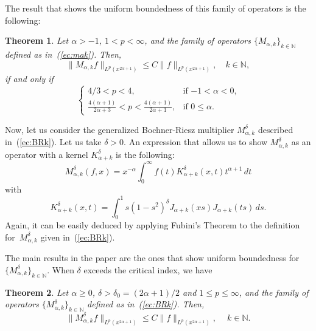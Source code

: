 \documentclass{amsart}
\newtheorem{thm}{Theorem}
\theoremstyle{remark}
\newcommand{\N}{\mathbb{N}}
\newcommand{\mak}{M_{\alpha,k}}
\newcommand{\BRk}{M_{\alpha,k}^{\delta}}
\newcommand{\KBRk}{K_{\alpha+k}^{\delta}} %
\newcommand{\lpnorm}[2]{\|{#1}\|_{L^{#2}(x^{2\alpha+1})}}
\begin{document}
The result that shows the uniform boundedness of this family of operators
is the following:

\begin{thm}
\label{thm:mak}
Let $\alpha > -1$, $1 < p < \infty$, and the family of operators
$\{\mak\}_{k\in\N}$ defined as in~(\ref{ec:mak}). Then,
\begin{equation*}
    \lpnorm{\mak f}{p} \le C \lpnorm{f}{p},
    \quad k\in \N,
\end{equation*}
if and only if
\begin{equation*}
\begin{cases}
    4/3 < p < 4, &\text{if \ $-1 < \alpha < 0$,} \\
    \frac{4(\alpha+1)}{2\alpha+3} < p 
      < \frac{4(\alpha+1)}{2\alpha+1}, &\text{if \ $0 \le \alpha$.}
\end{cases}
\end{equation*}
\end{thm}

Now, let us consider the generalized Bochner-Riesz multiplier $\BRk$ described
in~(\ref{ec:BRk}). Let us take $\delta>0$.
An expression that allows us to show $\BRk$ as an operator with a kernel
$\KBRk$ is the following:
\begin{equation*}
    \BRk(f,x)
    = x^{-\alpha} \int_0^{\infty} f(t) \KBRk(x,t) t^{\alpha+1} \, dt
\end{equation*}
with
\begin{equation}
\label{ec:KernelBRkintermedia}
    \KBRk(x,t)
    = \int_0^1 s (1-s^2)^{\delta}
      J_{\alpha+k}(xs)J_{\alpha+k}(ts) \, ds.
\end{equation}
Again, it can be easily deduced by applying Fubini's Theorem to the
definition for~$\BRk$ given in~(\ref{ec:BRk}).

The main results in the paper are the ones that show uniform boundedness for
$\{\BRk\}_{k\in\N}$. When $\delta$ exceeds the critical index, we have

\begin{thm}
\label{thm:encima}
Let $\alpha\ge 0$, $\delta > \delta_0 = (2\alpha+1)/2 $ and $1 \le p \le
\infty$, and the family of operators $\{\BRk\}_{k\in\N}$ defined as
in~(\ref{ec:BRk}). Then,
\begin{equation*}
    \lpnorm{\BRk f}{p}
    \le C \lpnorm{f}{p},
    \quad \ k\in \N.
\end{equation*}
\end{thm}
\end{document}
